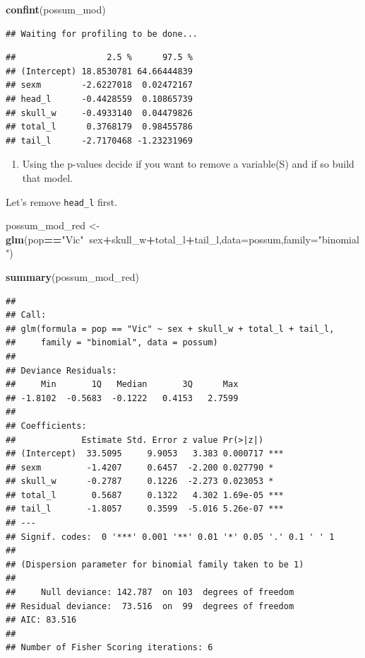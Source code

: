\documentclass[
]{book}
\newenvironment{Shaded}{\begin{snugshade}}{\end{snugshade}}
\newcommand{\DataTypeTok}[1]{\textcolor[rgb]{0.13,0.29,0.53}{#1}}
\newcommand{\KeywordTok}[1]{\textcolor[rgb]{0.13,0.29,0.53}{\textbf{#1}}}
\newcommand{\NormalTok}[1]{#1}
\newcommand{\OperatorTok}[1]{\textcolor[rgb]{0.81,0.36,0.00}{\textbf{#1}}}
\newcommand{\StringTok}[1]{\textcolor[rgb]{0.31,0.60,0.02}{#1}}
\providecommand{\tightlist}{%
  \setlength{\itemsep}{0pt}\setlength{\parskip}{0pt}}
\begin{document}
\begin{Shaded}
\begin{Highlighting}[]
\KeywordTok{confint}\NormalTok{(possum_mod)}
\end{Highlighting}
\end{Shaded}

\begin{verbatim}
## Waiting for profiling to be done...
\end{verbatim}

\begin{verbatim}
##                  2.5 %      97.5 %
## (Intercept) 18.8530781 64.66444839
## sexm        -2.6227018  0.02472167
## head_l      -0.4428559  0.10865739
## skull_w     -0.4933140  0.04479826
## total_l      0.3768179  0.98455786
## tail_l      -2.7170468 -1.23231969
\end{verbatim}

\begin{enumerate}
\def\labelenumi{\alph{enumi}.}
\setcounter{enumi}{2}
\tightlist
\item
  Using the p-values decide if you want to remove a variable(S) and if so build that model.
\end{enumerate}

Let's remove \texttt{head\_l} first.

\begin{Shaded}
\begin{Highlighting}[]
\NormalTok{possum_mod_red <-}\StringTok{ }\KeywordTok{glm}\NormalTok{(pop}\OperatorTok{==}\StringTok{"Vic"}\OperatorTok{~}\NormalTok{sex}\OperatorTok{+}\NormalTok{skull_w}\OperatorTok{+}\NormalTok{total_l}\OperatorTok{+}\NormalTok{tail_l,}\DataTypeTok{data=}\NormalTok{possum,}\DataTypeTok{family=}\StringTok{"binomial"}\NormalTok{)}
\end{Highlighting}
\end{Shaded}

\begin{Shaded}
\begin{Highlighting}[]
\KeywordTok{summary}\NormalTok{(possum_mod_red)}
\end{Highlighting}
\end{Shaded}

\begin{verbatim}
## 
## Call:
## glm(formula = pop == "Vic" ~ sex + skull_w + total_l + tail_l, 
##     family = "binomial", data = possum)
## 
## Deviance Residuals: 
##     Min       1Q   Median       3Q      Max  
## -1.8102  -0.5683  -0.1222   0.4153   2.7599  
## 
## Coefficients:
##             Estimate Std. Error z value Pr(>|z|)    
## (Intercept)  33.5095     9.9053   3.383 0.000717 ***
## sexm         -1.4207     0.6457  -2.200 0.027790 *  
## skull_w      -0.2787     0.1226  -2.273 0.023053 *  
## total_l       0.5687     0.1322   4.302 1.69e-05 ***
## tail_l       -1.8057     0.3599  -5.016 5.26e-07 ***
## ---
## Signif. codes:  0 '***' 0.001 '**' 0.01 '*' 0.05 '.' 0.1 ' ' 1
## 
## (Dispersion parameter for binomial family taken to be 1)
## 
##     Null deviance: 142.787  on 103  degrees of freedom
## Residual deviance:  73.516  on  99  degrees of freedom
## AIC: 83.516
## 
## Number of Fisher Scoring iterations: 6
\end{verbatim}
\end{document}
